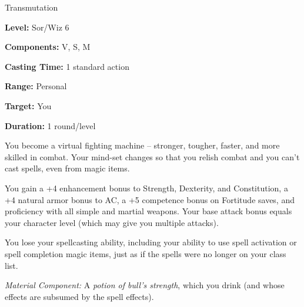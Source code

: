 
Transmutation

\textbf{Level:} Sor/Wiz 6

\textbf{Components:} V, S, M

\textbf{Casting Time:} 1 standard action

\textbf{Range:} Personal

\textbf{Target:} You

\textbf{Duration:} 1 round/level

You become a virtual fighting machine --  stronger, tougher, faster, and more skilled 
in combat. Your mind-set changes so that you relish combat and you can't cast spells, 
even from magic items.

You gain a +4 enhancement bonus to Strength, Dexterity, and Constitution, a +4 
natural armor bonus to AC, a +5 competence bonus on Fortitude saves, and proficiency 
with all simple and martial weapons. Your base attack bonus equals your character 
level (which may give you multiple attacks).

You lose your spellcasting ability, including your ability to use spell activation 
or spell completion magic items, just as if the spells were no longer on your class 
list.

\textit{Material Component:} A \textit{potion of bull's strength}, which you drink 
(and whose effects are subsumed by the spell effects).

